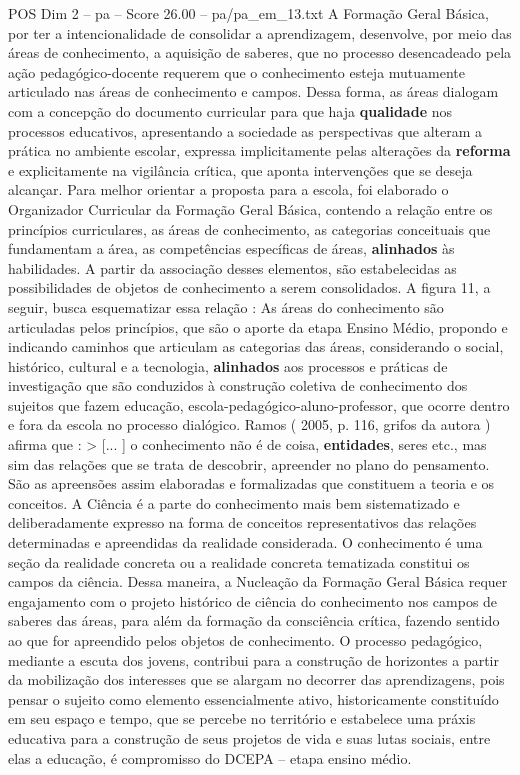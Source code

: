 \begin{textsample}{POS Dim 2 – pa – Score 26.00 – pa/pa\_em\_13.txt}
A Formação Geral Básica, por ter a intencionalidade de consolidar a aprendizagem, desenvolve, por meio das áreas de conhecimento, a aquisição de saberes, que no processo desencadeado pela ação pedagógico-docente requerem que o conhecimento esteja mutuamente articulado nas áreas de conhecimento e campos.
Dessa forma, as áreas dialogam com a concepção do documento curricular para que haja \textbf{qualidade} nos processos educativos, apresentando a sociedade as perspectivas que alteram a prática no ambiente escolar, expressa implicitamente pelas alterações da \textbf{reforma} e explicitamente na vigilância crítica, que aponta intervenções que se deseja alcançar.
Para melhor orientar a proposta para a escola, foi elaborado o Organizador Curricular da Formação Geral Básica, contendo a relação entre os princípios curriculares, as áreas de conhecimento, as categorias conceituais que fundamentam a área, as competências específicas de áreas, \textbf{alinhados} às habilidades.
A partir da associação desses elementos, são estabelecidas as possibilidades de objetos de conhecimento a serem consolidados.
A figura 11, a seguir, busca esquematizar essa relação : As áreas do conhecimento são articuladas pelos princípios, que são o aporte da etapa Ensino Médio, propondo e indicando caminhos que articulam as categorias das áreas, considerando o social, histórico, cultural e a tecnologia, \textbf{alinhados} aos processos e práticas de investigação que são conduzidos à construção coletiva de conhecimento dos sujeitos que fazem educação, escola-pedagógico-aluno-professor, que ocorre dentro e fora da escola no processo dialógico.
Ramos ( 2005, p. 116, grifos da autora ) afirma que : > [... ] o conhecimento não é de coisa, \textbf{entidades}, seres etc., mas sim das relações que se trata de descobrir, apreender no plano do pensamento.
São as apreensões assim elaboradas e formalizadas que constituem a teoria e os conceitos.
A Ciência é a parte do conhecimento mais bem sistematizado e deliberadamente expresso na forma de conceitos representativos das relações determinadas e apreendidas da realidade considerada.
O conhecimento é uma seção da realidade concreta ou a realidade concreta tematizada constitui os campos da ciência.
Dessa maneira, a Nucleação da Formação Geral Básica requer engajamento com o projeto histórico de ciência do conhecimento nos campos de saberes das áreas, para além da formação da consciência crítica, fazendo sentido ao que for apreendido pelos objetos de conhecimento.
O processo pedagógico, mediante a escuta dos jovens, contribui para a construção de horizontes a partir da mobilização dos interesses que se alargam no decorrer das aprendizagens, pois pensar o sujeito como elemento essencialmente ativo, historicamente constituído em seu espaço e tempo, que se percebe no território e estabelece uma práxis educativa para a construção de seus projetos de vida e suas lutas sociais, entre elas a educação, é compromisso do DCEPA – etapa ensino médio.

\end{textsample}
